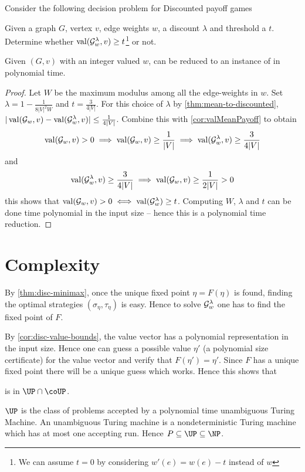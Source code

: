 Consider the following decision problem for Discounted payoff games
\begin{decision}[DISC]
    \label{dec:disc}
    Given a graph $G$, vertex $v$, edge weights $w$, a discount $\lambda$ and threshold a $t$. Determine whether $\operatorname{val}(\mathcal{G}^\lambda_w,v) \geq t$\footnote{We can assume $t=0$ by considering $w'(e)=w(e)-t$ instead of $w$} or not.
\end{decision}

\begin{corollary}
    \label{cor:mean2disc}
    Given $(G,v)$ with an integer valued $w$,  can be reduced to an instance of  in polynomial time.
\end{corollary}
\begin{proof}
    Let $W$ be the maximum modulus among all the edge-weights in $w$. Set $\lambda=1 -\frac{1}{8|V|^2W}$ and $t=\frac{3}{4|V|}$. For this choice of $\lambda$ by \autoref{thm:mean-to-discounted}, $|\operatorname{val}(\mathcal{G}_w, v) - \operatorname{val}(\mathcal{G}^\lambda_w,v)| \leq \frac{1}{4|V|}$. Combine this with \autoref{cor:valMeanPayoff} to obtain
    \[
        \operatorname{val}(\mathcal{G}_w,v) > 0 \implies \operatorname{val}(\mathcal{G}_w,v) \geq \frac{1}{|V|} \implies \operatorname{val}(\mathcal{G}^\lambda_w,v) \geq \frac{3}{4|V|}
    \]
    and
    \[
        \operatorname{val}(\mathcal{G}^\lambda_w,v) \geq \frac{3}{4|V|} \implies \operatorname{val}(\mathcal{G}_w,v) \geq \frac{1}{2|V|} > 0
    \]
    this shows that $\operatorname{val}(\mathcal{G}_w,v) > 0 \iff \operatorname{val}(\mathcal{G}^\lambda_w) \geq t$. Computing $W$, $\lambda$ and $t$ can be done time polynomial in the input size -- hence this is a polynomial time reduction.
\end{proof}

\section{Complexity}

By \autoref{thm:disc-minimax}, once the unique fixed point $\eta=F(\eta)$ is found, finding the optimal strategies $(\sigma_\eta,\tau_\eta)$ is easy. Hence to solve $\mathcal{G}^\lambda_w$ one  has to find the fixed point of $F$.

By \autoref{cor:disc-value-bounds}, the value vector has a polynomial representation in the input size. Hence one can guess a possible value $\eta'$ (a polynomial size certificate) for the value vector and verify that $F(\eta')=\eta'$. Since $F$ has a unique fixed point there will be a unique guess which works. Hence this shows that
\begin{theorem}
    \label{thm:disc-in-up}
     is in $\UP \cap \coUP$.
\end{theorem}
\begin{flushright}
\begin{boxedminipage}{0.95\textwidth}
$\UP$ is the class of problems accepted by a polynomial time unambiguous Turing Machine. An unambiguous Turing machine is a nondeterministic Turing machine which has at most one accepting run. Hence $P \subseteq \UP \subseteq \NP$.
\end{boxedminipage}
\end{flushright}

